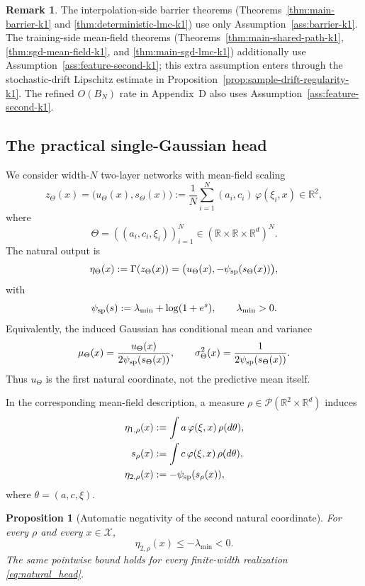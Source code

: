 \documentclass[11pt]{article}
\newtheorem{proposition}[theorem]{Proposition}
\theoremstyle{definition}
\newtheorem{remark}[theorem]{Remark}
\newcommand{\R}{\mathbb{R}}
\newcommand{\mc}[1]{\mathcal{#1}}
\begin{document}
\begin{remark}
The interpolation-side barrier theorems
(Theorems~\ref{thm:main-barrier-k1} and \ref{thm:deterministic-lmc-k1}) use
only Assumption~\ref{ass:barrier-k1}. The training-side mean-field theorems
(Theorems~\ref{thm:main-shared-path-k1}, \ref{thm:sgd-mean-field-k1}, and
\ref{thm:main-sgd-lmc-k1}) additionally use
Assumption~\ref{ass:feature-second-k1}; this extra assumption enters through
the stochastic-drift Lipschitz estimate in
Proposition~\ref{prop:sample-drift-regularity-k1}. The refined $O(B_N)$ rate in
Appendix~D also uses Assumption~\ref{ass:feature-second-k1}.
\end{remark}

\subsection{The practical single-Gaussian head}

We consider width-$N$ two-layer networks with mean-field scaling
\begin{equation}
  z_\Theta(x)
  =
  \bigl(u_\Theta(x),s_\Theta(x)\bigr)
  :=
  \frac1N\sum_{i=1}^N (a_i,c_i)\,\varphi(\xi_i,x)
  \in \R^2,
  \label{eq:raw_head}
\end{equation}
where
\[
  \Theta=((a_i,c_i,\xi_i))_{i=1}^N\in(\R\times\R\times\R^d)^N.
\]
The natural output is
\begin{equation}
  \eta_\Theta(x)
  :=
  \Gamma(z_\Theta(x))
  =
  \bigl(u_\Theta(x),-\psi_{\rm sp}(s_\Theta(x))\bigr),
  \label{eq:natural_head}
\end{equation}
with
\[
  \psi_{\rm sp}(s):=\lambda_{\min}+\log(1+e^s),
  \qquad
  \lambda_{\min}>0.
\]
Equivalently, the induced Gaussian has conditional mean and variance
\[
  \mu_\Theta(x)=\frac{u_\Theta(x)}{2\psi_{\rm sp}(s_\Theta(x))},
  \qquad
  \sigma_\Theta^2(x)=\frac{1}{2\psi_{\rm sp}(s_\Theta(x))}.
\]
Thus $u_\Theta$ is the first natural coordinate, not the predictive mean
itself.

In the corresponding mean-field description, a measure
$\rho\in\mc{P}(\R^2\times\R^d)$ induces
\begin{align}
  \eta_{1,\rho}(x)
  &:=
  \int a\,\varphi(\xi,x)\,\rho(d\theta),
  \\
  s_\rho(x)
  &:=
  \int c\,\varphi(\xi,x)\,\rho(d\theta),
  \\
  \eta_{2,\rho}(x)
  &:=
  -\psi_{\rm sp}(s_\rho(x)),
\end{align}
where $\theta=(a,c,\xi)$.

\begin{proposition}[Automatic negativity of the second natural coordinate]
\label{prop:softplus-domain-k1}
For every $\rho$ and every $x\in\mc{X}$,
\[
  \eta_{2,\rho}(x)\le -\lambda_{\min}<0.
\]
The same pointwise bound holds for every finite-width realization
\eqref{eq:natural_head}.
\end{proposition}
\end{document}
